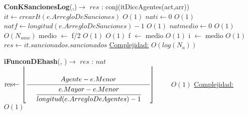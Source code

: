 \begin{Algoritmos}
\begin{algorithm}[H]
\begin{algorithmic}[1]
        \end{algorithmic}
    \end{algorithm}
    \begin{algorithm}[H]
        \begin{algorithmic}[1]
            \State \textbf{ConKSancionesLog}(,)$\to$ $res$ : conj(itDiccAgentes(act,arr))
            \State 	$it \gets crearIt(e.ArregloDeSanciones)$ \Comment $O(1)$
            \State $nat i \gets 0$ \Comment $O(1)$
            \State $nat f \gets longitud(e.ArregloDeSanciones)-1$ \Comment $O(1)$
            \State $nat medio \gets 0$ \Comment $O(1)$
            	\Comment $O(N_{sanc})$
	         	\State medio $\gets$ f/2 \Comment $O(1)$
					\Comment $O(1)$
                	\State f $\gets$ medio \Comment $O(1)$
                \Else
                	\State i $\gets$ medio \Comment $O(1)$					
                \EndIf
	     	\EndWhile
            \State $res \gets it.sancionados.sancionados$
            \Statex \underline{Complejidad:} $O(log(N_{a}))$
        \end{algorithmic}
    \end{algorithm}


    \begin{algorithm}[H]
        \begin{algorithmic}[1]
            \State \textbf{iFunconDEhash}(, )$\to$ $res$ : $nat$
            \State 	$\res \gets \left\lfloor \cfrac{Agente-e.Menor}{\ \ \ \ \cfrac{e.Mayor-e.Menor}{longitud(e.ArregloDeAgentes)-1}\ \ \ \ } \right\rfloor\qquad$	\Comment $O(1)$
            \Statex \underline{Complejidad:} $O(1)$
        \end{algorithmic}
    \end{algorithm}
\end{Algoritmos}

	
